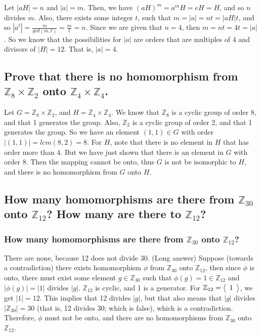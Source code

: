 \documentclass{article}
\newcommand{\cyc}[1]{\scaleleftright[1ex]{\langle}{\begin{array}{c}{#1}\end{array}}{\rangle}}
\begin{document}
Let $|aH| = n$ and $|a| = m$.  Then, we have $(aH)^m = a^mH = eH = H$, and so $n$ divides $m$.  Also, there exists some integer $t$, such that $m = |a| = nt = |aH|t$, and so $|a^t| = \frac{m}{gcd(m, t)} = \frac{m}{t} = n$.  Since we are given that $n = 4$, then $m = nt = 4t = |a|$. So we know that the possibilities for $|a|$ are orders that are multiples of 4 and divisors of $|H| = 12$.  That is, $|a| = 4$.  

\subsection{Prove that there is no homomorphism from $\mathbb{Z}_8 \times \mathbb{Z}_2$ onto $\mathbb{Z}_4 \times \mathbb{Z}_4$.}

Let $G = \mathbb{Z}_8 \times \mathbb{Z}_2$, and $H = \mathbb{Z}_4 \times \mathbb{Z}_4$.  We know that $\mathbb{Z}_8$ is a cyclic group of order 8, and that 1 generates the group.  Also, $\mathbb{Z}_2$ is a cyclic group of order 2, and that 1 generates the group. So we have an element $(1,1) \in G$ with order $|(1,1)| = lcm(8, 2) = 8$.  For $H$, note that there is no element in $H$ that has order more than 4.  But we have just shown that there is an element in $G$ with order 8.  Then the mapping cannot be onto, thus $G$ is not be isomorphic to $H$, and there is no homomorphism from $G$ onto $H$.  

\newcommand{\zzz}{\mathbb{Z}_{30}}
\newcommand{\ztt}{\mathbb{Z}_{12}}
\subsection{How many homomorphisms are there from $\zzz$ onto $\ztt$? How many are there to $\ztt$?}


\subsubsection{How many homomorphisms are there from $\zzz$ onto $\ztt$?}

There are none, because 12 does not divide 30.  (Long answer) Suppose (towards a contradiction) there exists homomorphism $\phi$ from $\zzz$ onto $\ztt$, then since $\phi$ is onto, there must exist some element $g \in \zzz$ such that $\phi(g) = 1 \in \ztt$ and $|\phi(g)| = |1|$ divides $|g|$.  $\ztt$ is cyclic, and 1 is a generator.  For $\ztt = \cyc{1}$, we get $|1| = 12$.  This implies that 12 divides $|g|$, but that also means that $|g|$ divides $|\zzz| = 30$ (that is, 12 divides 30; which is false), which is a contradiction.  Therefore, $\phi$ must not be onto, and there are no homomorphisms from $\zzz$ onto $\ztt$.
\end{document}

